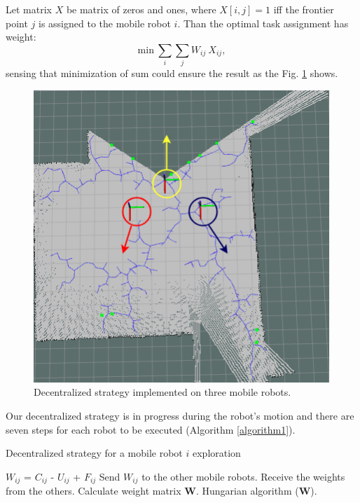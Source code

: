 \documentclass[letterpaper, 10 pt, conference]{ieeeconf}  %
\begin{document}
Let matrix $X$ be matrix of zeros and ones, where $X[i,j]=1$ iff the frontier point $j$ is assigned to the mobile robot $i$.
Than the optimal task assignment has weight:
\begin{equation}
     {\mathrm{min}}\ \sum_{i} \sum_{j} W_{ij}\ X_{ij},
\end{equation}
sensing that minimization of sum could ensure the result as the Fig. \ref{fig:start} shows. 

\begin{figure}[t!]
	\centering\includegraphics[width=0.9\columnwidth]{start.png}
	\caption {Decentralized strategy implemented on three mobile robots.}
	\label{fig:start}
\end{figure}

Our decentralized strategy is in progress during the robot's motion and there are seven steps for each robot to be executed (Algorithm \ref{algorithm1}).    

\begin{algorithm}[h!]
\caption{Decentralized strategy for a mobile robot $i$ exploration}
\label{algorithm1}
\begin{algorithmic}[1]
\State\hspace{\algorithmicindent} $W_{ij}$ = $C_{ij}$ - $U_{ij}$ + $F_{ij}$
\State\hspace{\algorithmicindent} Send $W_{ij}$ to the other mobile robots.
\State \hspace{\algorithmicindent} Receive the weights from the others.
\State \hspace{\algorithmicindent} Calculate weight matrix $\boldsymbol{W}$.
\State \hspace{\algorithmicindent} Hungarian algorithm ($\boldsymbol{W}$).
\EndFor
\end{algorithmic}
\end{algorithm}
\end{document}
